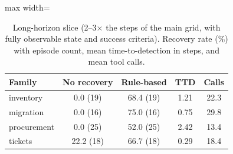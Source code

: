 \begin{table}[t]
\centering\small
\caption{Long-horizon slice (2--3$\times$ the steps of the main grid, with fully
observable state and success criteria). Recovery rate (\%) with episode count,
mean time-to-detection in steps, and mean tool calls.}
\label{tab:long}
\begin{adjustbox}{max width=\textwidth}
\begin{tabular}{@{}lcccc@{}}
\toprule
Family & No recovery & Rule-based & TTD & Calls \\
\midrule
inventory & 0.0 (19) & 68.4 (19) & 1.21 & 22.3 \\
migration & 0.0 (16) & 75.0 (16) & 0.75 & 29.8 \\
procurement & 0.0 (25) & 52.0 (25) & 2.42 & 13.4 \\
tickets & 22.2 (18) & 66.7 (18) & 0.29 & 18.4 \\
\bottomrule
\end{tabular}
\end{adjustbox}
\end{table}
